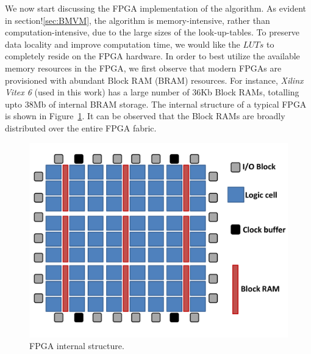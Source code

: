 \documentclass[conference, 9pt]{IEEEtran}
\begin{document}
We now start discussing the FPGA implementation of the algorithm. As evident in section!\ref{sec:BMVM}, the algorithm is memory-intensive, rather than computation-intensive, due to the large sizes of the look-up-tables. To preserve data locality and improve computation time, we would like the $LUTs$ to completely reside on the FPGA hardware. In order to best utilize the available memory resources in the FPGA, we first observe that modern FPGAs are provisioned with abundant Block RAM (BRAM) resources. For instance, \emph{Xilinx Vitex 6} (used in this work) has a large number of 36Kb Block RAMs, totalling upto 38Mb of internal BRAM storage. The internal structure of a typical FPGA is shown in Figure~\ref{FPGA}. It can be observed that the Block RAMs are broadly distributed over the entire FPGA fabric.\\

\begin{figure}[t!]
\centering
\includegraphics[scale=0.35]{figs/FPGA.pdf}
\caption{FPGA internal structure.}
\label{FPGA}
\end{figure}

% 
%  
% 	  
  
\end{document}
